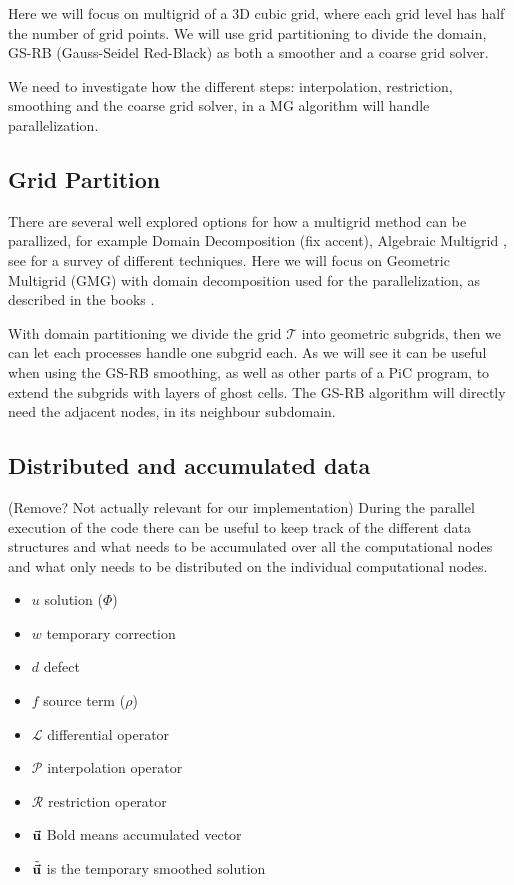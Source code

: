 	Here we will focus on multigrid of a 3D cubic grid, where each grid level has
  half the number of grid points. We will use grid
	partitioning to divide the domain, GS-RB (Gauss-Seidel Red-Black) as both a
	smoother and a coarse grid solver.

	We need to investigate how the different steps: interpolation, restriction,
	smoothing and the coarse grid solver, in a MG algorithm will handle parallelization.

	\subsection{Grid Partition}
		\label{sec:grid_partitioning}
		There are several well explored options for how a multigrid method can be
		parallized, for example Domain Decomposition \citep{arraras_domain_2015} (fix accent),
		Algebraic Multigrid \citep{stuben_review_2001}, see \citet{chow_survey_2006}
		for a survey of different techniques. Here we will focus on Geometric
		Multigrid (GMG) with domain decomposition used for the parallelization, as
		described in the books \cite{trottenberg_multigrid_2000, hackbusch_multigrid_1982}.

		With domain partitioning we divide the grid \(\mathcal{T}\) into geometric
		subgrids, then we can let each processes handle one subgrid each. As we will
		see it can be useful when using the GS-RB smoothing, as well as other parts
    of a PiC program, to extend the subgrids with layers of ghost cells. The GS-RB
    algorithm will directly need the adjacent nodes, in its neighbour subdomain.

	\subsection{Distributed and accumulated data}
		(Remove? Not actually relevant for our implementation)
		During the parallel execution of the code there can be useful to keep track
		of the different data structures and what needs to be accumulated over all
		the computational nodes and what only needs to be distributed on the individual computational nodes.

		\begin{itemize}
			\item \(u\) solution (\(\Phi\))
			\item \(w\) temporary correction
			\item \(d\) defect
			\item \(f\) source term (\(\rho\))
			\item \(\mathcal{L}\) differential operator
			\item \(\mathcal{P}\) interpolation operator
			\item \(\mathcal{R}\) restriction operator
			\item \( \va{u}\) Bold means accumulated vector
			\item \( \tilde{\va{ u }} \) is the temporary smoothed solution
		\end{itemize}

